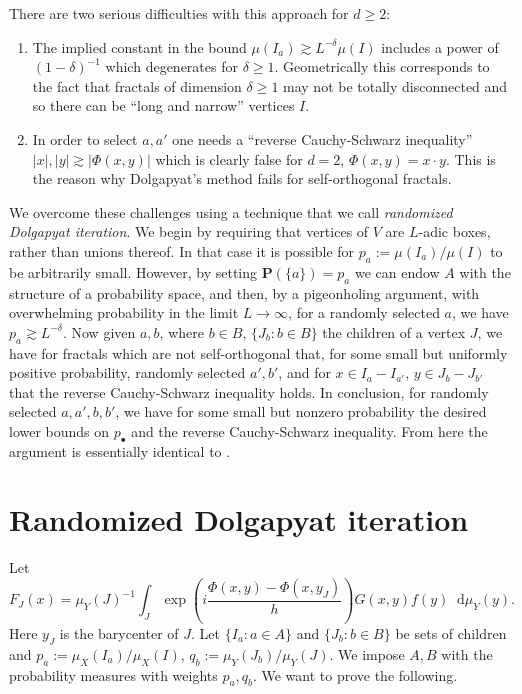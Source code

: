 \documentclass[reqno,10pt]{amsart}
\newcommand{\PP}{\mathbf P}
\newcommand*\dif{\mathop{}\!\mathrm{d}}
\newcommand{\dfn}[1]{\emph{#1}\index{#1}}
\theoremstyle{definition}
\numberwithin{equation}{section}
\begin{document}
There are two serious difficulties with this approach for $d \geq 2$:
\begin{enumerate}
\item The implied constant in the bound $\mu(I_a) \gtrsim L^{-\delta} \mu(I)$ includes a power of $(1 - \delta)^{-1}$ which degenerates for $\delta \geq 1$. Geometrically this corresponds to the fact that fractals of dimension $\delta \geq 1$ may not be totally disconnected and so there can be ``long and narrow'' vertices $I$.
\item In order to select $a, a'$ one needs a ``reverse Cauchy-Schwarz inequality'' $|x|, |y| \gtrsim |\Phi(x, y)|$ which is clearly false for $d = 2$, $\Phi(x, y) = x \cdot y$. This is the reason why Dolgapyat's method fails for self-orthogonal fractals.
\end{enumerate}
We overcome these challenges using a technique that we call \dfn{randomized Dolgapyat iteration}.
We begin by requiring that vertices of $V$ are $L$-adic boxes, rather than unions thereof.
In that case it is possible for $p_a := \mu(I_a)/\mu(I)$ to be arbitrarily small.
However, by setting $\PP(\{a\}) = p_a$ we can endow $A$ with the structure of a probability space, and then, by a pigeonholing argument, with overwhelming probability in the limit $L \to \infty$, for a randomly selected $a$, we have $p_a \gtrsim L^{-\delta}$.
Now given $a, b$, where $b \in B$, $\{J_b: b \in B\}$ the children of a vertex $J$, we have for fractals which are not self-orthogonal that, for some small but uniformly positive probability, randomly selected $a', b'$, and for $x \in I_a - I_{a'}$, $y \in J_b - J_{b'}$ that the reverse Cauchy-Schwarz inequality holds.
In conclusion, for randomly selected $a, a', b, b'$, we have for some small but nonzero probability the desired lower bounds on $p_\bullet$ and the reverse Cauchy-Schwarz inequality.
From here the argument is essentially identical to \cite{Dyatlov_2018}.

\section{Randomized Dolgapyat iteration}
Let
$$F_J(x) = \mu_Y(J)^{-1} \int_J \exp\left(i\frac{\Phi(x, y) - \Phi(x, y_J)}{h}\right) G(x, y) f(y) \dif \mu_Y(y).$$
Here $y_J$ is the barycenter of $J$.
Let $\{I_a: a \in A\}$ and $\{J_b: b \in B\}$ be sets of children and $p_a := \mu_X(I_a)/\mu_X(I)$, $q_b := \mu_Y(J_b)/\mu_Y(J)$.
We impose $A, B$ with the probability measures with weights $p_a, q_b$.
We want to prove the following.
\end{document}
